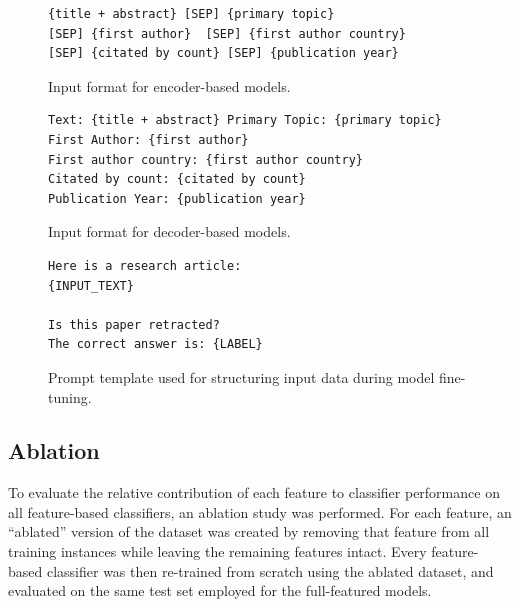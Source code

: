\documentclass[pdflatex,sn-mathphys-num]{sn-jnl}
\begin{document}
\begin{figure}[h]
	\begin{tcolorbox}[colback=lightgray!5!white,colframe=black,title=INPUT_TEXT Formation]
		\begin{verbatim}
{title + abstract} [SEP] {primary topic}
[SEP] {first author}  [SEP] {first author country} 
[SEP] {citated by count} [SEP] {publication year}
\end{verbatim}
	\end{tcolorbox}
	\caption{Input format for encoder-based models.}
	\label{fig:encoder_input_template}
\end{figure}


\begin{figure}[h]
	\begin{tcolorbox}[colback=lightgray!5!white,colframe=black,title=INPUT_TEXT Formation]
		\begin{verbatim}
Text: {title + abstract} Primary Topic: {primary topic}
First Author: {first author} 
First author country: {first author country} 
Citated by count: {citated by count} 
Publication Year: {publication year}
\end{verbatim}
	\end{tcolorbox}
	\caption{Input format for decoder-based models.}
	\label{fig:llm_input_template}
\end{figure}


\begin{figure}[h]
	\begin{tcolorbox}[colback=lightgray!5!white,colframe=black,title=Prompt Template]
		\begin{verbatim}
Here is a research article:
{INPUT_TEXT}

Is this paper retracted?
The correct answer is: {LABEL}
\end{verbatim}
	\end{tcolorbox}
	\caption{Prompt template used for structuring input data during model fine-tuning.}
	\label{fig:prompt_template}
\end{figure}




\subsection{Ablation}

To evaluate the relative contribution of each feature to classifier performance on all feature-based classifiers, an ablation study was performed. For each feature, an ``ablated'' version of the dataset was created by removing that feature from all training instances while leaving the remaining features intact. Every feature-based classifier was then re-trained from scratch using the ablated dataset, and evaluated on the same test set employed for the full-featured models.
\end{document}
